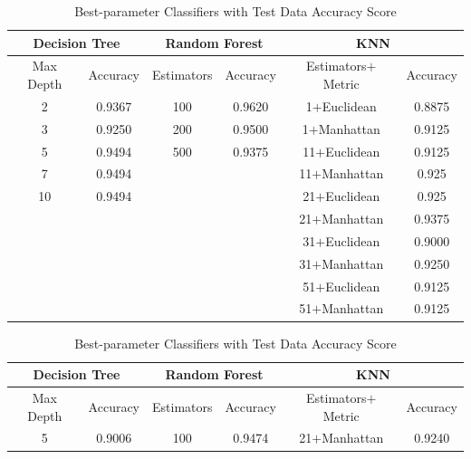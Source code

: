 \documentclass{article}
\begin{document}
	\begin{table}[!ht]
		\caption{Classifier Parameters and 5-Fold Cross Validation Accuracy Scores}
		\begin{tabular} {|c|c|c|c|c|c|} \cline{1-6} 
			\multicolumn{2}{|c|}{Decision Tree} & \multicolumn{2}{|c|}{Random Forest} & \multicolumn{2}{|c|}{KNN} \\ \hline
			Max Depth & Accuracy & Estimators & Accuracy & Estimators$+$Metric & Accuracy \\ \hline
			2 & 0.9367 & 100 & 0.9620 & 1$+$Euclidean & 0.8875 \\
			3 & 0.9250 & 200 & 0.9500 & 1$+$Manhattan & 0.9125 \\
			5 & 0.9494 & 500 & 0.9375 & 11$+$Euclidean & 0.9125 \\ 
			7 & 0.9494 & & & 11$+$Manhattan & 0.925 \\ 
			10 & 0.9494 & & & 21$+$Euclidean & 0.925 \\
			& & & & 21$+$Manhattan & 0.9375 \\ 
			& & & & 31$+$Euclidean & 0.9000 \\ 
			& & & & 31$+$Manhattan & 0.9250 \\ 
			& & & & 51$+$Euclidean & 0.9125 \\ 
			& & & & 51$+$Manhattan & 0.9125 \\ \hline
		\end{tabular}
		\caption{Best-parameter Classifiers with Test Data Accuracy Score}
		\begin{tabular} {|c|c|c|c|c|c|} \cline{1-6} 
			\multicolumn{2}{|c|}{Decision Tree} & \multicolumn{2}{|c|}{Random Forest} & \multicolumn{2}{|c|}{KNN} \\ \hline
			Max Depth & Accuracy & Estimators & Accuracy & Estimators$+$Metric & Accuracy \\ \hline
			5 & 0.9006 & 100 & 0.9474 & 21$+$Manhattan & 0.9240 \\ \hline
		\end{tabular}
	\end{table}
\end{document}
